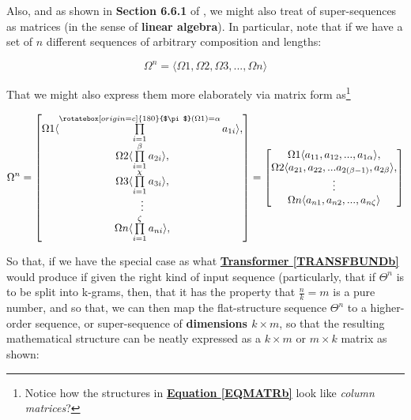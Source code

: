 \documentclass[a4paper, 18pt]{book} %
\newcommand{\invpi}{\rotatebox[origin=c]{180}{$\pi$}}
\begin{document}
\begin{appendices}
Also, and as shown in \textbf{Section 6.6.1} of \cite{lutalo_2025_trans_genetics}, we might also treat of super-sequences as matrices (in the sense of \textbf{linear algebra}). In particular, note that if we have a set of $n$ different sequences of arbitrary composition and lengths:

\vspace{1em}
\begin{equation}
 \Omega^n = \langle \Omega1, \Omega2, \Omega3,..., \Omega n \rangle
\end{equation}
\vspace{1em}


That we might also express them more elaborately via matrix form as\footnote{Notice how the structures in \textbf{\hyperref[EQMATRb]{Equation \ref{EQMATRb}}} look like \textit{column matrices}?}

\vspace{1em}
\begin{multline}
\label{EQMATRb}
 \Omega^n = 
 \begin{bmatrix}
 \Omega1 \langle \prod\limits_{i=1}^{\invpi(\Omega 1) = \alpha} a_{1i} \rangle,\\
  \Omega2 \langle \prod\limits_{i=1}^{\beta} a_{2i} \rangle,\\
   \Omega3 \langle \prod\limits_{i=1}^{\chi} a_{3i} \rangle,\\
   \vdots \\
   \Omega n \langle \prod\limits_{i=1}^{\zeta} a_{ni} \rangle,\\
 \end{bmatrix} =
 \begin{bmatrix}
 \Omega1 \langle a_{11},a_{12},...,a_{1\alpha} \rangle,\\
   \Omega2 \langle a_{21},a_{22},...a_{2(\beta-1)} ,a_{2\beta} \rangle,\\
   \vdots \\
     \Omega n \langle a_{n1},a_{n2},...,a_{n\zeta} \rangle\\
 \end{bmatrix}
\end{multline}
\vspace{1em}


So that, if we have the special case as what \textbf{\hyperref[TRANSFBUNDb]{Transformer \ref{TRANSFBUNDb}}} would produce if given the right kind of input sequence (particularly, that if $\Theta^n$ is to be split into k-grams, then, that it has the property that $\frac{n}{k} = m$ is a pure number\cite{Lutalo2024gtnc}, and so that, we can then map the flat-structure sequence $\Theta^n$ to a higher-order sequence, or super-sequence of \textbf{dimensions $k \times m$}, so that the resulting mathematical structure can be neatly expressed as a  $k \times m$ or $m \times k$ matrix as shown:


\end{appendices}
\end{document}
